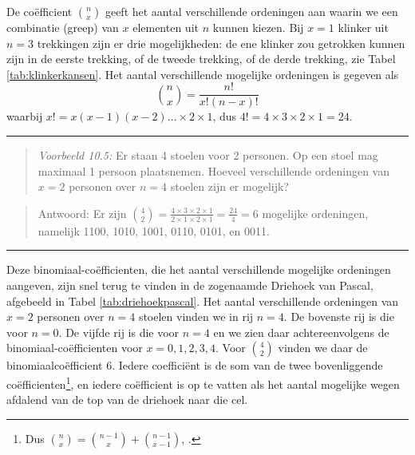 \documentclass[
]{book}
\begin{document}
De coëfficient \({n \choose x}\) geeft het aantal verschillende ordeningen
aan waarin we een combinatie (greep) van \(x\) elementen uit \(n\) kunnen
kiezen. Bij \(x=1\) klinker uit \(n=3\) trekkingen zijn er drie
mogelijkheden: de ene klinker zou getrokken kunnen zijn in de eerste
trekking, of de tweede trekking, of de derde trekking, zie
Tabel \ref{tab:klinkerkansen}. Het aantal verschillende mogelijke
ordeningen is gegeven als
\begin{equation}
  {n \choose x} = \frac{n!}{x!(n-x)!}
  \label{eq:choose}
\end{equation}
waarbij
\(x! = x (x-1) (x-2) \dots \times 2 \times 1\), dus
\(4!=4\times3\times2\times1=24\).

\begin{center}\rule{0.5\linewidth}{0.5pt}\end{center}

\begin{quote}
\emph{Voorbeeld 10.5:} Er staan 4 stoelen voor 2 personen. Op een stoel mag maximaal 1 persoon
plaatsnemen. Hoeveel verschillende ordeningen van \(x=2\) personen over
\(n=4\) stoelen zijn er mogelijk?
\end{quote}

\begin{quote}
Antwoord: Er zijn
\({4 \choose 2} = \frac{4\times3\times2\times1}{2\times1\times2\times1} = \frac{24}{4} = 6\)
mogelijke ordeningen, namelijk 1100, 1010, 1001, 0110, 0101, en 0011.
\end{quote}

\begin{center}\rule{0.5\linewidth}{0.5pt}\end{center}

Deze binomiaal-coëfficienten, die het aantal verschillende mogelijke
ordeningen aangeven, zijn snel terug te vinden in de zogenaamde Driehoek
van Pascal, afgebeeld in Tabel \ref{tab:driehoekpascal}.
Het aantal verschillende
ordeningen van \(x=2\) personen over \(n=4\) stoelen vinden we in rij \(n=4\).
De bovenste rij is die voor \(n=0\). De vijfde rij is die voor \(n=4\) en we
zien daar achtereenvolgens de binomiaal-coëfficienten voor
\(x= 0, 1, 2, 3, 4\). Voor \({4 \choose 2}\) vinden we daar de
binomiaalcoëfficient \(6\). Iedere coefficiënt is de som van de twee
bovenliggende coëfficienten\footnote{Dus \({n \choose x} = {n-1 \choose x} + {n-1 \choose x-1}\), \citep{Weis15}.}, en iedere coëfficient is op te vatten
als het aantal mogelijke wegen afdalend van de top van de driehoek naar
die cel.
\end{document}
